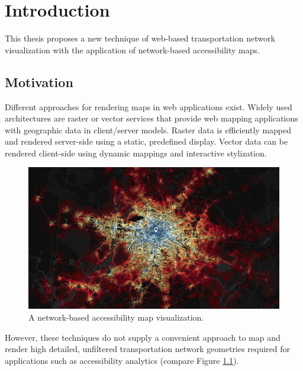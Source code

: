 
\cleardoublepage              %
\chapter{Introduction}
  \label{chap:intro}
  This thesis proposes a new technique of web-based transportation network
  visualization with the application of network-based accessibility maps.\par

  \section{Motivation}
    \label{sec:intro:motiv}
    Different approaches for rendering maps in web applications exist.
    Widely used architectures are raster or vector services that provide web
    mapping applications with geographic data in client/server models.
    Raster data is efficiently mapped and rendered server-side using a
    static, predefined display. Vector data can be rendered client-side
    using dynamic mappings and interactive stylization.\par

    \begin{figure}[h]
      \centering
      \includegraphics[width=\linewidth]
        {./img/screenshot-teaser-7200s-publictransport.png}
      \caption{A network-based accessibility map visualization.}
      \label{fig:intro:teasr}
    \end{figure}

    However, these techniques do not supply a convenient approach to map and
    render high detailed, unfiltered transportation network geometries
    required for applications such as accessibility analytics (compare Figure
    \ref{fig:intro:teasr}).\par

